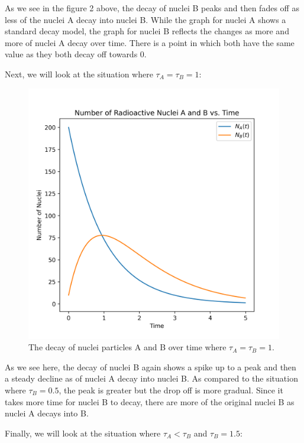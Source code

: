 \documentclass[pra,twocolumn,showpacs,amsmath,amssymb]{revtex4-2}
\begin{document}
As we see in the figure 2 above, the decay of nuclei B peaks and then fades off as less of the nuclei A decay into nuclei B. While the graph for nuclei A shows a standard decay model, the graph for nuclei B reflects the changes as more and more of nuclei A decay over time. There is a point in which both have the same value as they both decay off towards 0.

\par Next, we will look at the situation where \(\tau_A = \tau_B = 1\):

\begin{figure}[H]
\includegraphics[scale=0.50]{Nuclei_AB_1_0.01.png}
\caption{The decay of nuclei particles A and B over time where \(\tau_A = \tau_B = 1\).}
\end{figure}

As we see here, the decay of nuclei B again shows a spike up to a peak and then a steady decline as of nuclei A decay into nuclei B. As compared to the situation where \(\tau_B = 0.5\), the peak is greater but the drop off is more gradual. Since it takes more time for nuclei B to decay, there are more of the original nuclei B as nuclei A decays into B.

\par Finally, we will look at the situation where \(\tau_A < \tau_B\) and \(\tau_B = 1.5\):
\end{document}
